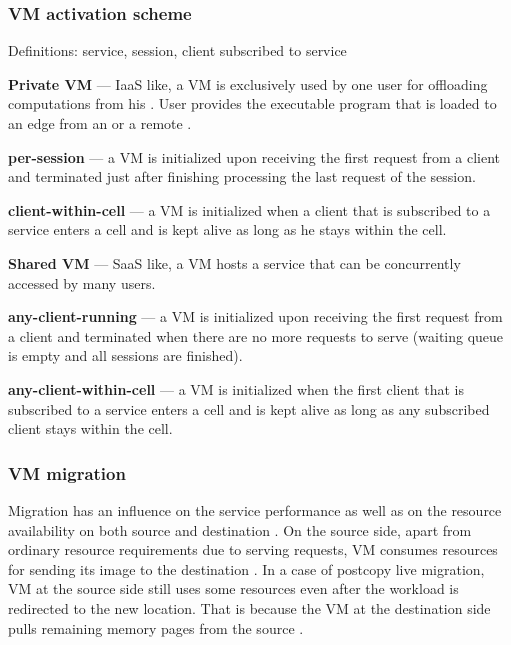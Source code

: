 \subsubsection{VM activation scheme}
Definitions: service, session, client subscribed to service 

\textbf{Private VM} --- IaaS like, a VM is exclusively used by one user for offloading computations from his \ue{}.
User provides the executable program that is loaded to an edge \dc{} from an \ue{} or a remote \dc{}.
		\begin{description}
			\item \textbf{per-session} --- a VM is initialized upon receiving the first request from a client and terminated just after finishing processing the last request of the session.
			\item \textbf{client-within-cell} --- a VM is initialized when a client that is subscribed to a service enters a cell and is kept alive as long as he stays within the cell. 
		\end{description}
			
\textbf{Shared VM} --- SaaS like, a VM hosts a service that can be concurrently accessed by many users.
		\begin{description}
			\item \textbf{any-client-running} --- a VM is initialized upon receiving the first request from a client and terminated when there are no more requests to serve (waiting queue is empty and all sessions are finished).
			\item \textbf{any-client-within-cell} --- a VM is initialized when the first client that is subscribed to a service enters a cell and is kept alive as long as any subscribed client stays within the cell. 
		\end{description}

\subsubsection{VM migration}
Migration has an influence on the service performance as well as on the resource availability on both source and destination \dc{}.
On the source side, apart from ordinary resource requirements due to serving requests, VM consumes resources for sending its image to the destination \dc{}.
In a case of postcopy live migration, VM at the source side still uses some resources even after the workload is redirected to the new location.
That is because the VM at the destination side pulls remaining memory pages from the source \dc{}.

